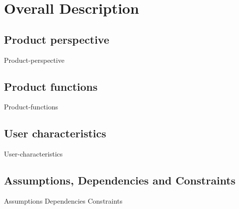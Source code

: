 \section{Overall Description}

\subsection{Product	perspective}
{Product-perspective}
	

\subsection{Product	functions}
{Product-functions}
	
	
\subsection{User characteristics}
{User-characteristics}
	
	
\subsection{Assumptions, Dependencies and Constraints}
{Assumptions}
{Dependencies}
{Constraints}